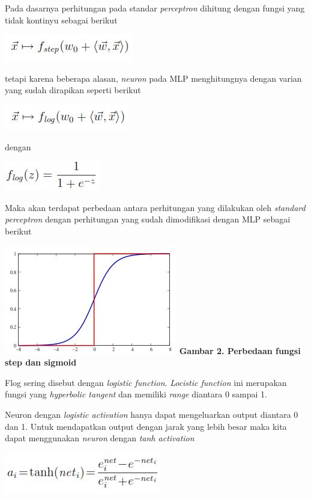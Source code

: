 	Pada dasarnya perhitungan pada standar \textit{perceptron} dihitung dengan fungsi yang tidak kontinyu sebagai berikut
	\begin{center}
		\includegraphics{equation-1.jpg}
	\end{center}
	tetapi karena beberapa alasan, \textit{neuron} pada MLP menghitungnya dengan varian yang sudah dirapikan seperti berikut
	\begin{center}
		\includegraphics{equation-2.jpg}
	\end{center}
	dengan
	\begin{center}
		\includegraphics{equation-3.jpg}
	\end{center}
	Maka akan terdapat perbedaan antara perhitungan yang dilakukan oleh \textit{standard perceptron} dengan perhitungan yang sudah dimodifikasi dengan MLP sebagai berikut
	\begin{center}
		\includegraphics{graphic-1.jpg}
		\newline \textbf{Gambar 2. Perbedaan fungsi step dan sigmoid}
	\end{center}
	Flog sering disebut dengan \textit{logistic function}. \textit{Locistic function} ini merupakan fungsi yang \textit{hyperbolic tangent} dan memiliki \textit{range} diantara 0 sampai 1.
	\par Neuron dengan \textit{logistic activation} hanya dapat mengeluarkan output diantara 0 dan 1. Untuk mendapatkan output dengan jarak yang lebih besar maka kita dapat menggunakan \textit{neuron} dengan \textit{tanh activation}
	\begin{center}
		\includegraphics{equation-4.jpg}
	\end{center}
